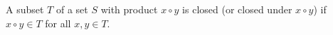 A subset $T$ of a set $S$ with product $x \circ y$ is closed (or closed under $x \circ y$) if $x \circ y \in T$ for all $x, y \in T$.
